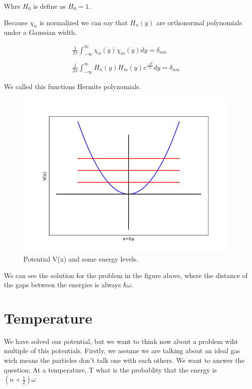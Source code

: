 Whre $H_0$ is define as $H_0=1$.

Because $\chi_n$ is normalized we can say that $H_n(y)$ are orthonormal polynomials under a Gaussian width.

\begin{equation}
  \begin{array}{c}
    \frac{1}{2\pi}\int_{-\infty}^{\infty} \chi_n(y) \chi_m(y) dy = \delta_{nm}
    \\

    \\
    \frac{1}{2\pi}\int_{-\infty}^{\infty} H_n(y) H_m(y) e^{\frac{-y^2}{2}}dy = \delta_{nm}
  \end{array}
\end{equation}

We called this functions Hermite polynomials.

\begin{figure}[H]
  \centering
  \includegraphics{images7/sol.png}
  \caption{Potential V(x) and some energy levels.}
\end{figure}

We can see the solution for the problem in the figure above, where the distance of the gaps between the energies is always $\hbar\omega$.


\section{Temperature}

We have solved our potential, but we want to think now about a problem wiht multiple of this potentials. Firstly, we assume we are talking about an ideal gas wich means the particles don't talk one with each others. We want to answer the question; At a temperature, T what is the probablity that the energy is $\left(n+\frac{1}{2}\right)\omega$


